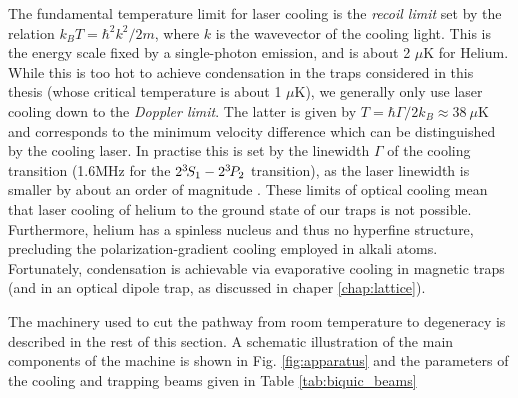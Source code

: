 	The fundamental temperature limit for laser cooling is the \emph{recoil limit} set by the relation $k_B T = \hbar^2k^2/2m$, where $k$ is the wavevector of the cooling light.
	This is the energy scale fixed by a single-photon emission, and is about 2 $\mu$K for Helium.
	While this is too hot to achieve condensation in the traps considered in this thesis (whose critical temperature is about 1 $\mu$K), we generally only use laser cooling down to the \emph{Doppler limit}.
	The latter is given by $T = \hbar\Gamma/2 k_B\approx 38~\mu$K and corresponds to the minimum velocity difference which can be distinguished by the cooling laser.
	In practise this is set by the linewidth $\Gamma$ of the cooling transition (1.6MHz for the $2^{3\!} S_1 - 2^{3\!} P_2$ transition), as the laser linewidth is smaller by about an order of magnitude \cite{Shin16}.
	These limits of optical cooling mean that laser cooling of helium to the ground state of our traps is not possible.
	Furthermore, helium has a spinless nucleus and thus no hyperfine structure, precluding the polarization-gradient cooling employed in alkali atoms.
	Fortunately, condensation is achievable via evaporative cooling in magnetic traps (and in an optical dipole trap, as discussed in chaper \ref{chap:lattice}).
	
	The machinery used to cut the pathway from room temperature to degeneracy is described in the rest of this section. A schematic illustration of the main components of the machine is shown in Fig. \ref{fig:apparatus} and the parameters of the cooling and trapping beams given in Table \ref{tab:biquic_beams}




